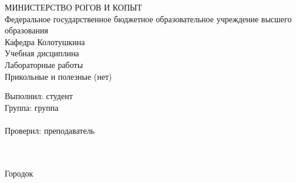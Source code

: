 \begin{center}
    \MakeUppercase{Министерство рогов и копыт}\\
    Федеральное государственное бюджетное образовательное учреждение
    высшего образования \\
    Кафедра Колотушкина\\
    Учебная дисциплина \\
    \hfill\break
    \hfill\break
    \hfill\break
    \hfill\break
    \hfill\break
    Лабораторные работы\\
    Прикольные и полезные (нет)\\
    \hfill\break
    \hfill\break
\end{center}

\begin{flushright}
    Выполнил: студент\\
    Группа: группа \\
    \underline{\hspace{3cm}} \\
    Проверил: преподаватель\\
    \underline{\hspace{3cm}} \\
    \say{\underline{\hspace{1cm}}} \underline{\hspace{2cm}} \the\year\\
\end{flushright}
\hfill\break
\hfill\break
\begin{center}
    Городок\\
    \the\year
\end{center}
\thispagestyle{empty} %


\newpage
